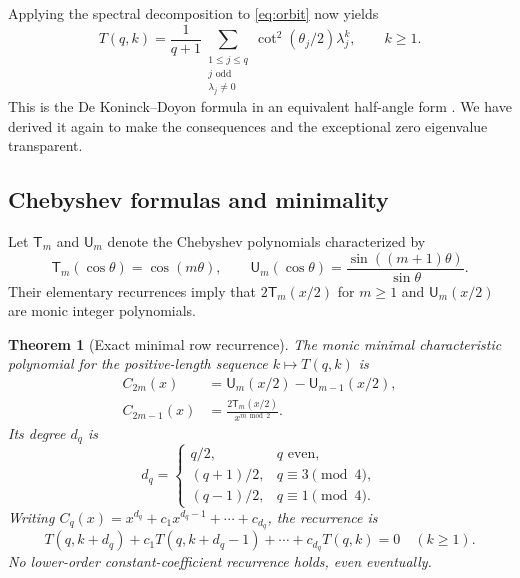 \documentclass[11pt,letterpaper]{article}
\numberwithin{equation}{section}
\newtheorem{theorem}{Theorem}[section]
\theoremstyle{definition}
\begin{document}
Applying the spectral decomposition to \eqref{eq:orbit} now yields
\begin{equation}\label{eq:spectral}
T(q,k)=\frac1{q+1}
\sum_{\substack{1\le j\le q\\j\text{ odd}\\\lambda_j\ne0}}
\cot^2(\theta_j/2)\lambda_j^k,\qquad k\ge1.
\end{equation}
This is the De Koninck--Doyon formula in an equivalent half-angle form
\cite[Eq.~(17)]{dek}.  We have derived it again to make the consequences
and the exceptional zero eigenvalue transparent.

\subsection{Chebyshev formulas and minimality}
Let $\mathsf T_m$ and $\mathsf U_m$ denote the Chebyshev polynomials
characterized by
\[
\mathsf T_m(\cos\theta)=\cos(m\theta),\qquad
\mathsf U_m(\cos\theta)=\frac{\sin((m+1)\theta)}{\sin\theta}.
\]
Their elementary recurrences imply that
$2\mathsf T_m(x/2)$ for $m\ge1$ and $\mathsf U_m(x/2)$ are monic integer
polynomials.

\begin{theorem}[Exact minimal row recurrence]\label{thm:minimal}
The monic minimal characteristic polynomial for the positive-length
sequence $k\mapsto T(q,k)$ is
\begin{align}
C_{2m}(x)&=\mathsf U_m(x/2)-\mathsf U_{m-1}(x/2),\label{eq:evenC}\\
C_{2m-1}(x)&=\frac{2\mathsf T_m(x/2)}{x^{m\bmod2}}.
\label{eq:oddC}
\end{align}
Its degree $d_q$ is
\begin{equation}\label{eq:degree}
d_q=\begin{cases}
q/2,&q\text{ even},\\
(q+1)/2,&q\equiv3\pmod4,\\
(q-1)/2,&q\equiv1\pmod4.
\end{cases}
\end{equation}
Writing $C_q(x)=x^{d_q}+c_1x^{d_q-1}+\cdots+c_{d_q}$, the recurrence is
\begin{equation}\label{eq:rowrecurrence}
T(q,k+d_q)+c_1T(q,k+d_q-1)+\cdots+c_{d_q}T(q,k)=0
\quad(k\ge1).
\end{equation}
No lower-order constant-coefficient recurrence holds, even eventually.
\end{theorem}
\end{document}

